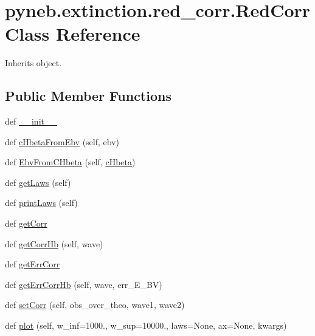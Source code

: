 \hypertarget{classpyneb_1_1extinction_1_1red__corr_1_1_red_corr}{}\section{pyneb.\+extinction.\+red\+\_\+corr.\+Red\+Corr Class Reference}
\label{classpyneb_1_1extinction_1_1red__corr_1_1_red_corr}


Inherits object.

\subsection*{Public Member Functions}
\begin{DoxyCompactItemize}
\item 
def \hyperlink{classpyneb_1_1extinction_1_1red__corr_1_1_red_corr_a27b836e3bd87558f6156a8bf94fbf658}{\+\_\+\+\_\+init\+\_\+\+\_\+}
\item 
def \hyperlink{classpyneb_1_1extinction_1_1red__corr_1_1_red_corr_aa6deda4f66a76e07236cfa10f50a7be2}{c\+Hbeta\+From\+Ebv} (self, ebv)
\item 
def \hyperlink{classpyneb_1_1extinction_1_1red__corr_1_1_red_corr_a0230c671df9a21eeb7d15008946780d0}{Ebv\+From\+C\+Hbeta} (self, \hyperlink{classpyneb_1_1extinction_1_1red__corr_1_1_red_corr_aaf16ae2a0bdb5dd620f9db382ffeebc9}{c\+Hbeta})
\item 
def \hyperlink{classpyneb_1_1extinction_1_1red__corr_1_1_red_corr_a8040208c6f193358ed1af2ced21fdd26}{get\+Laws} (self)
\item 
def \hyperlink{classpyneb_1_1extinction_1_1red__corr_1_1_red_corr_a95b4079c79dc6128406d0f992fa60e12}{print\+Laws} (self)
\item 
def \hyperlink{classpyneb_1_1extinction_1_1red__corr_1_1_red_corr_a4fd27cfde692dbe6f3ff3d039bde2929}{get\+Corr}
\item 
def \hyperlink{classpyneb_1_1extinction_1_1red__corr_1_1_red_corr_a5a570e787f6fe64d23e34b5646e46b6c}{get\+Corr\+Hb} (self, wave)
\item 
def \hyperlink{classpyneb_1_1extinction_1_1red__corr_1_1_red_corr_a6e7097b97a6552f30422884af3faff69}{get\+Err\+Corr}
\item 
def \hyperlink{classpyneb_1_1extinction_1_1red__corr_1_1_red_corr_a296a9cd0f689dd7e9be3dc788e88ddaa}{get\+Err\+Corr\+Hb} (self, wave, err\+\_\+\+E\+\_\+\+B\+V)
\item 
def \hyperlink{classpyneb_1_1extinction_1_1red__corr_1_1_red_corr_af46527e15978d583e5d857182b560ce4}{set\+Corr} (self, obs\+\_\+over\+\_\+theo, wave1, wave2)
\item 
def \hyperlink{classpyneb_1_1extinction_1_1red__corr_1_1_red_corr_aa0348dcba9bf9bbdb3296191319c683c}{plot} (self, w\+\_\+inf=1000., w\+\_\+sup=10000., laws=None, ax=None, kwargs)
\end{DoxyCompactItemize}
